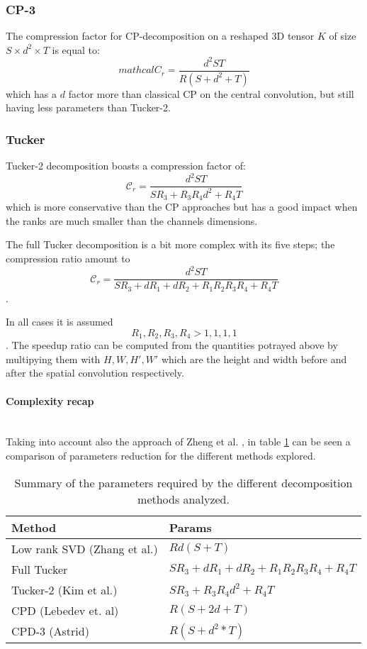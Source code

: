 \subsubsection{CP-3}
The compression factor for CP-decomposition on a reshaped 3D tensor $K$ of size $S \times d^2 \times T$ is equal to: 
\begin{equation}
	mathcal{C}_r = \frac{d^2ST}{R(S+d^2+T)}
\end{equation}
which has a $d$ factor more than classical CP on the central convolution, but still having less parameters than Tucker-2. 

\subsubsection{Tucker} 
Tucker-2 decomposition boasts a compression factor of: $$\mathcal{C}_r = \frac{d^2ST}{SR_3 + R_3 R_4 d^2 + R_4T}$$ which is more conservative than the CP approaches but has a good impact when the ranks are much smaller than the channels dimensions. 

The full Tucker decomposition is a bit more complex with its five steps; the compression ratio amount to  $$\mathcal{C}_r = \frac{d^2ST}{SR_3 + dR_1+dR_2+R_1R_2R_3R_4 + R_4T}$$.

In all cases it is assumed $${R_1, R_2, R_3, R_4} > {1,1,1,1}$$. The speedup ratio can be computed from the quantities potrayed above by multipying them with $H, W, H', W'$ which are the height and width before and after the spatial convolution respectively. 

\paragraph{Complexity recap}\\
Taking into account also the approach of Zheng et al. \parencite{zhang2015SVD}, in table \ref{tab:compression} can be seen a comparison of parameters reduction for the different methods explored. 

\begin{table}[]
\centering
\caption{Summary of the parameters required by the different decomposition methods analyzed.}
\label{tab:compression}
\begin{tabular}{l|l}
\hline
Method                                            & Params                \\ \hline
\multicolumn{1}{|l|}{Low rank SVD (Zhang et al.)} & \multicolumn{1}{l|}{$Rd(S+T)$ } \\ \hline
\multicolumn{1}{|l|}{Full Tucker}                 & \multicolumn{1}{l|}{$SR_3 + dR_1+dR_2+R_1R_2R_3R_4 + R_4T$ } \\ \hline
\multicolumn{1}{|l|}{Tucker-2 (Kim et al.)}       & \multicolumn{1}{l|}{$SR_3 + R_3 R_4 d^2 + R_4T$ } \\ \hline
\multicolumn{1}{|l|}{CPD (Lebedev et. al)}        & \multicolumn{1}{l|}{$R(S+2d+T)$} \\ \hline
\multicolumn{1}{|l|}{CPD-3 (Astrid)}              & \multicolumn{1}{l|}{$R(S+d^2*T)$} \\ \hline
\end{tabular}
\end{table}    
    

